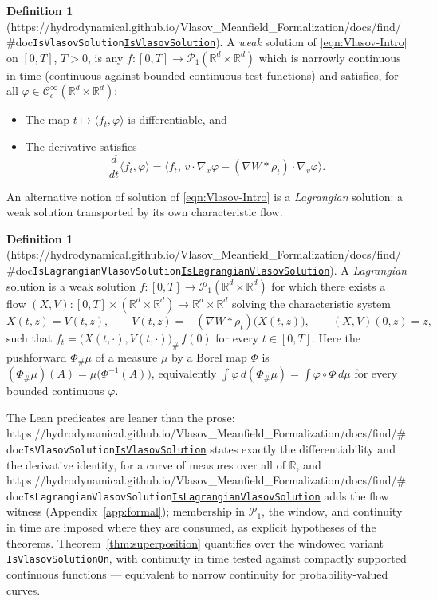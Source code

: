 \documentclass[11pt]{article}
\theoremstyle{plain}
\theoremstyle{definition}
\newtheorem{definition}[theorem]{Definition}
\theoremstyle{remark}
\newcommand{\R}{\mathbb{R}}
\newcommand{\lean}[1]{\texttt{#1}}
\newcommand{\leanbaseurl}{https://hydrodynamical.github.io/Vlasov\_Meanfield\_Formalization/docs/find/\#doc}
\newcommand{\leanlink}[1]{\ifx\leanbaseurl\empty\lean{#1}\else\href{\leanbaseurl/Vlasov.#1}{\lean{#1}}\fi}
\begin{document}
\begin{definition}[\leanlink{IsVlasovSolution}]\label{def:weak-Vlasov}
  A \emph{weak} solution of \eqref{eqn:Vlasov-Intro} on $[0,T]$, $T>0$, is any $f : [0,T] \rightarrow \mathcal{P}_1(\R^d \times \R^d)$ which is narrowly continuous in time (continuous against bounded continuous test functions) and satisfies, for all $\varphi\in \mathcal{C}^\infty_c(\R^{d}\times \R^d)$:
  \begin{itemize}
    \item The map $t\mapsto \langle f_t , \varphi\rangle$ is differentiable, and 
    \item The derivative satisfies 
    \begin{equation*}
      \frac{d}{dt}\langle f_t,\varphi\rangle = \langle f_t,\, v\cdot\nabla_x\varphi -
(\nabla W * \rho_t)\cdot\nabla_v\varphi\rangle .
    \end{equation*}
  \end{itemize}
\end{definition}

An alternative notion of solution of \eqref{eqn:Vlasov-Intro} is a \emph{Lagrangian} solution: a weak solution transported by its own characteristic flow.

\begin{definition}[\leanlink{IsLagrangianVlasovSolution}]\label{def:Lagrangian}
  A \emph{Lagrangian} solution is a
  weak solution $f:[0,T]\to\mathcal{P}_1(\R^d\times\R^d)$ for which there exists a flow
  $(X,V):[0,T]\times(\R^d\times\R^d)\to\R^d\times\R^d$ solving the characteristic system
  \[
    \dot X(t,z)=V(t,z),\qquad \dot V(t,z)=-(\nabla W*\rho_t)\big(X(t,z)\big),\qquad (X,V)(0,z)=z,
  \]
  such that $f_t=\big(X(t,\cdot),V(t,\cdot)\big)_\#\,f(0)$ for every $t\in[0,T]$. Here the
  pushforward $\Phi_\#\mu$ of a measure $\mu$ by a Borel map $\Phi$ is
  $(\Phi_\#\mu)(A)=\mu\big(\Phi^{-1}(A)\big)$, equivalently $\int \varphi\,d(\Phi_\#\mu)=\int
  \varphi\circ\Phi\,d\mu$ for every bounded continuous $\varphi$.
\end{definition}

\noindent The Lean predicates are leaner than the prose: \leanlink{IsVlasovSolution} states
exactly the differentiability and the derivative identity, for a curve of measures over all
of $\R$, and \leanlink{IsLagrangianVlasovSolution} adds the flow witness
(Appendix~\ref{app:formal}); membership in $\mathcal{P}_1$, the window, and continuity in
time are imposed where they are consumed, as explicit hypotheses of the theorems.
Theorem~\ref{thm:superposition} quantifies over the windowed variant
\lean{IsVlasovSolutionOn}, with continuity in time tested against compactly supported
continuous functions --- equivalent to narrow continuity for probability-valued curves.
\end{document}
